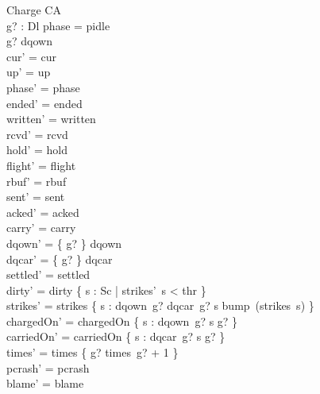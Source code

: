 \documentclass[a4paper,10pt,fleqn]{article}
\begin{document}
\begin{schema}{Charge}
  \Delta CA \\
  g? : Dl
\where
  phase = pidle \\
  g? \in \dom dqown \\
  cur' = cur \\
  up' = up \\
  phase' = phase \\
  ended' = ended \\
  written' = written \\
  rcvd' = rcvd \\
  hold' = hold \\
  flight' = flight \\
  rbuf' = rbuf \\
  sent' = sent \\
  acked' = acked \\
  carry' = carry \\
  dqown' = \{ g? \} \ndres dqown \\
  dqcar' = \{ g? \} \ndres dqcar \\
  settled' = settled \\
  dirty' = dirty \cap \{ s : Sc | strikes'~s < thr \} \\
  strikes' = strikes \oplus \{ s : dqown~g? \cup dqcar~g? \spot s \mapsto bump~(strikes~s) \} \\
  chargedOn' = chargedOn \cup \{ s : dqown~g? \spot s \mapsto g? \} \\
  carriedOn' = carriedOn \cup \{ s : dqcar~g? \spot s \mapsto g? \} \\
  times' = times \oplus \{ g? \mapsto times~g? + 1 \} \\
  pcrash' = pcrash \\
  blame' = blame
\end{schema}
\end{document}

